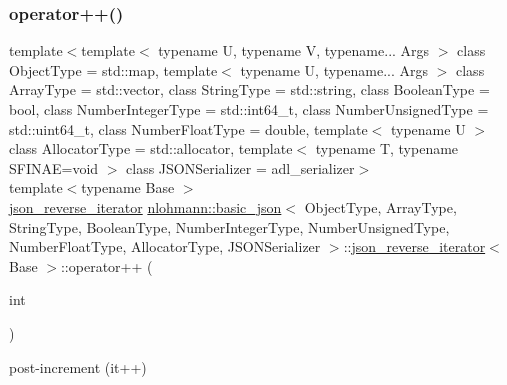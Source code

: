 \subsubsection{\texorpdfstring{operator++()}{operator++()}\hspace{0.1cm}{\footnotesize\ttfamily [1/2]}}
{\footnotesize\ttfamily template$<$template$<$ typename U, typename V, typename... Args $>$ class Object\+Type = std\+::map, template$<$ typename U, typename... Args $>$ class Array\+Type = std\+::vector, class String\+Type  = std\+::string, class Boolean\+Type  = bool, class Number\+Integer\+Type  = std\+::int64\+\_\+t, class Number\+Unsigned\+Type  = std\+::uint64\+\_\+t, class Number\+Float\+Type  = double, template$<$ typename U $>$ class Allocator\+Type = std\+::allocator, template$<$ typename T, typename S\+F\+I\+N\+A\+E=void $>$ class J\+S\+O\+N\+Serializer = adl\+\_\+serializer$>$ \\
template$<$typename Base $>$ \\
\mbox{\hyperlink{classnlohmann_1_1basic__json_1_1json__reverse__iterator}{json\+\_\+reverse\+\_\+iterator}} \mbox{\hyperlink{classnlohmann_1_1basic__json}{nlohmann\+::basic\+\_\+json}}$<$ Object\+Type, Array\+Type, String\+Type, Boolean\+Type, Number\+Integer\+Type, Number\+Unsigned\+Type, Number\+Float\+Type, Allocator\+Type, J\+S\+O\+N\+Serializer $>$\+::\mbox{\hyperlink{classnlohmann_1_1basic__json_1_1json__reverse__iterator}{json\+\_\+reverse\+\_\+iterator}}$<$ Base $>$\+::operator++ (\begin{DoxyParamCaption}\item[{int}]{ }\end{DoxyParamCaption})\hspace{0.3cm}{\ttfamily [inline]}}



post-\/increment (it++) 

\mbox{\label{classnlohmann_1_1basic__json_1_1json__reverse__iterator_aa10b55b0c57a849cfe0cba15e7818e97}} 
